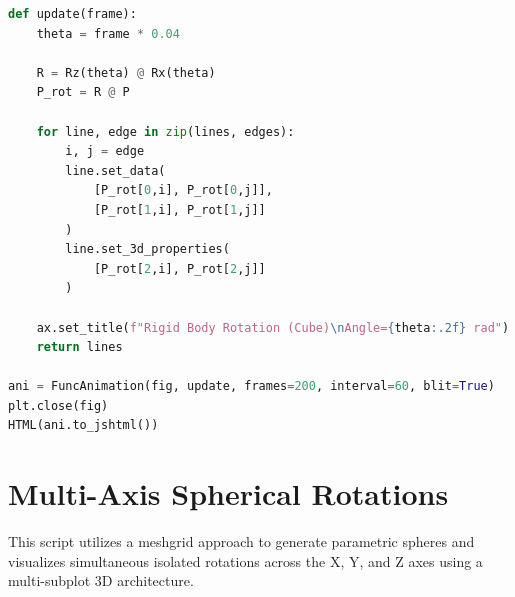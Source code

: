 \documentclass[12pt, a4paper]{report}
\begin{document}
\begin{lstlisting}[language=Python, caption={3D Cube Rotation using Euler Matrices and FuncAnimation}]
def update(frame):
    theta = frame * 0.04

    R = Rz(theta) @ Rx(theta)
    P_rot = R @ P

    for line, edge in zip(lines, edges):
        i, j = edge
        line.set_data(
            [P_rot[0,i], P_rot[0,j]],
            [P_rot[1,i], P_rot[1,j]]
        )
        line.set_3d_properties(
            [P_rot[2,i], P_rot[2,j]]
        )

    ax.set_title(f"Rigid Body Rotation (Cube)\nAngle={theta:.2f} rad")
    return lines

ani = FuncAnimation(fig, update, frames=200, interval=60, blit=True)
plt.close(fig)
HTML(ani.to_jshtml())
\end{lstlisting}

\newpage

\section{Multi-Axis Spherical Rotations}
This script utilizes a meshgrid approach to generate parametric spheres and visualizes simultaneous isolated rotations across the X, Y, and Z axes using a multi-subplot 3D architecture.
\end{document}
